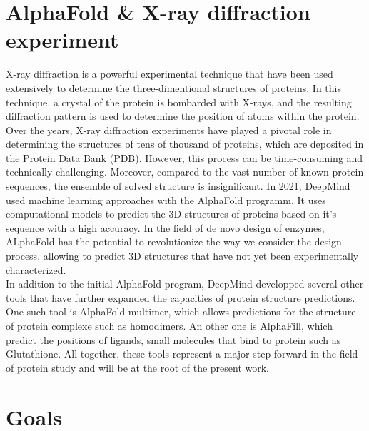 \section{AlphaFold \& X-ray diffraction experiment}
X-ray diffraction is a powerful experimental technique that have been used extensively to determine the three-dimentional structures of proteins. 
In this technique, a crystal of the protein is bombarded with X-rays, and the resulting diffraction pattern is used to determine the position of atoms within the protein. Over the years, X-ray diffraction experiments have played a pivotal role in determining the structures of tens of thousand of proteins, which are deposited in the Protein Data Bank (PDB). 
However, this process can be time-consuming and technically challenging. Moreover, compared to the vast number of known protein sequences, the ensemble of solved structure is insignificant. In 2021, DeepMind used machine learning approaches with the AlphaFold\cite{AlphaFold} programm. It uses computational models to predict the 3D structures of proteins based on it's sequence with a high accuracy. In the field of de novo design of enzymes, ALphaFold has the potential to revolutionize the way we consider the design process, allowing to predict 3D structures that have not yet been experimentally characterized.\\
\noindent In addition to the initial AlphaFold program, DeepMind developped several other tools that have further expanded the capacities of protein structure predictions. One such tool is AlphaFold-multimer\cite{Multimer}, which allows predictions for the structure of protein complexe such as homodimers. An other one is AlphaFill\cite{AlphaFill}, which predict the positions of ligands, small molecules that bind to protein such as Glutathione. All together, these tools represent a major step forward in the field of protein study and will be at the root of the present work.
\section{Goals}